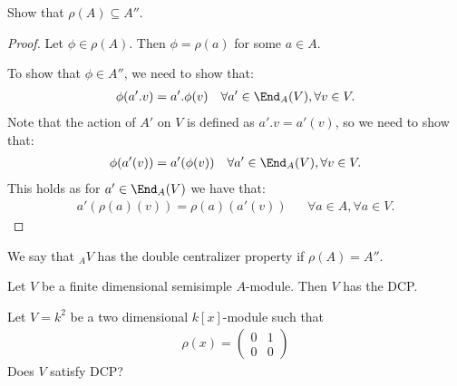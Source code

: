 \begin{prop}
Show that \(\rho (A)\subseteq A''\).
\end{prop}

\begin{proof}
Let \(\phi \in \rho (A)\). Then \(\phi =\rho (a)\) for some \(a\in A\).

To show that \(\phi \in A''\), we need to show that:
\begin{align*}
\phi (a'.v)=a'.\phi (v) &&\forall a'\in \End_A(V), \forall v\in V.
\end{align*}
Note that the action of \(A'\) on \(V\) is defined as \(a'.v=a'(v)\), so we need to show that:
\begin{align*}
\phi (a'(v))=a'(\phi (v)) &&\forall a'\in \End_A(V), \forall v\in V.
\end{align*}
This holds as for \(a'\in \End_A(V)\) we have that:
\begin{align*}
a'(\rho (a)(v))=\rho (a)(a'(v)) && \forall a\in A, \forall a\in V.
\end{align*}
\end{proof}

\begin{defn}
We say that \(_AV\) has the double centralizer property if \(\rho (A)=A''\).
\end{defn}

\begin{thm}
Let \(V\) be a finite dimensional semisimple \(A\)-module. Then \(V\) has the DCP.
\end{thm}

\begin{prop}
Let \(V=k^{2}\) be a two dimensional \(k[x]\)-module such that
\begin{align*}
\rho (x)=\begin{pmatrix}0& 1 \\ 0 & 0\end{pmatrix}
\end{align*}
Does \(V\) satisfy DCP?
\end{prop}

